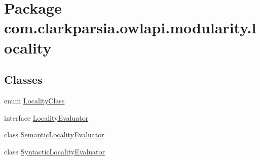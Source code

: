 \hypertarget{namespacecom_1_1clarkparsia_1_1owlapi_1_1modularity_1_1locality}{\section{Package com.\-clarkparsia.\-owlapi.\-modularity.\-locality}
\label{namespacecom_1_1clarkparsia_1_1owlapi_1_1modularity_1_1locality}
}
\subsection*{Classes}
\begin{DoxyCompactItemize}
\item 
enum \hyperlink{enumcom_1_1clarkparsia_1_1owlapi_1_1modularity_1_1locality_1_1_locality_class}{Locality\-Class}
\item 
interface \hyperlink{interfacecom_1_1clarkparsia_1_1owlapi_1_1modularity_1_1locality_1_1_locality_evaluator}{Locality\-Evaluator}
\item 
class \hyperlink{classcom_1_1clarkparsia_1_1owlapi_1_1modularity_1_1locality_1_1_semantic_locality_evaluator}{Semantic\-Locality\-Evaluator}
\item 
class \hyperlink{classcom_1_1clarkparsia_1_1owlapi_1_1modularity_1_1locality_1_1_syntactic_locality_evaluator}{Syntactic\-Locality\-Evaluator}
\end{DoxyCompactItemize}
